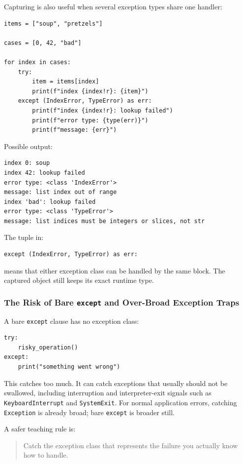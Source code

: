 \documentclass[a4paper,twoside]{report}
\begin{document}
Capturing is also useful when several exception types share one handler:

\begin{verbatim}
items = ["soup", "pretzels"]

cases = [0, 42, "bad"]

for index in cases:
    try:
        item = items[index]
        print(f"index {index!r}: {item}")
    except (IndexError, TypeError) as err:
        print(f"index {index!r}: lookup failed")
        print(f"error type: {type(err)}")
        print(f"message: {err}")
\end{verbatim}

Possible output:

\begin{verbatim}
index 0: soup
index 42: lookup failed
error type: <class 'IndexError'>
message: list index out of range
index 'bad': lookup failed
error type: <class 'TypeError'>
message: list indices must be integers or slices, not str
\end{verbatim}

The tuple in:

\begin{verbatim}
except (IndexError, TypeError) as err:
\end{verbatim}

means that either exception class can be handled by the same block. The captured object still keeps its exact runtime type.

\subsubsection{The Risk of Bare \texttt{except} and Over-Broad Exception Traps}

A bare \texttt{except} clause has no exception class:

\begin{verbatim}
try:
    risky_operation()
except:
    print("something went wrong")
\end{verbatim}

This catches too much. It can catch exceptions that usually should not be swallowed, including interruption and interpreter-exit signals such as \texttt{KeyboardInterrupt} and \texttt{SystemExit}. For normal application errors, catching \texttt{Exception} is already broad; bare \texttt{except} is broader still.

A safer teaching rule is:

\begin{quote}
Catch the exception class that represents the failure you actually know how to handle.
\end{quote}
\end{document}
